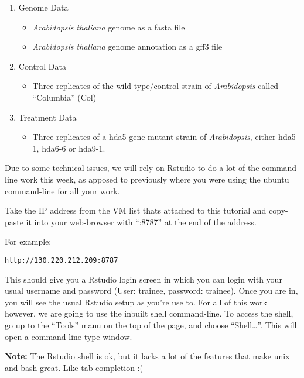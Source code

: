 \begin{enumerate}
\def\labelenumi{\arabic{enumi}.}
\item
  Genome Data

  \begin{itemize}
  \tightlist
  \item
    \emph{Arabidopsis thaliana} genome as a fasta file
  \item
    \emph{Arabidopsis thaliana} genome annotation as a gff3 file
  \end{itemize}
\item
  Control Data

  \begin{itemize}
  \tightlist
  \item
    Three replicates of the wild-type/control strain of
    \emph{Arabidopsis} called ``Columbia'' (Col)
  \end{itemize}
\item
  Treatment Data

  \begin{itemize}
  \tightlist
  \item
    Three replicates of a hda5 gene mutant strain of \emph{Arabidopsis},
    either hda5-1, hda6-6 or hda9-1.
  \end{itemize}
\end{enumerate}

Due to some technical issues, we will rely on Rstudio to do a lot of the
command-line work this week, as apposed to previously where you were
using the ubuntu command-line for all your work.

Take the IP address from the VM list thats attached to this tutorial and
copy-paste it into your web-browser with ``:8787'' at the end of the
address.

For example:

\begin{verbatim}
http://130.220.212.209:8787
\end{verbatim}

This should give you a Rstudio login screen in which you can login with
your usual username and password (User: trainee, password: trainee).
Once you are in, you will see the usual Rstudio setup as you're use to.
For all of this work however, we are going to use the inbuilt shell
command-line. To access the shell, go up to the ``Tools'' manu on the
top of the page, and choose ``Shell\ldots{}''. This will open a
command-line type window.

\textbf{Note:} The Rstudio shell is ok, but it lacks a lot of the
features that make unix and bash great. Like tab completion :(


